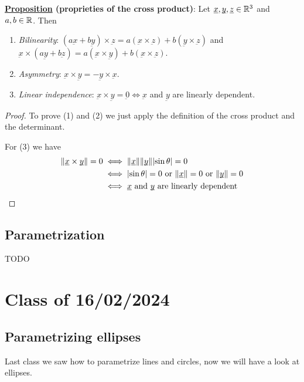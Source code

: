 \documentclass[10pt]{extarticle}
\renewcommand{\vec}[1]{\underbar{\ensuremath{#1}}}
\begin{document}
\textbf{\underline{Proposition} (proprieties of the cross product)}:
Let $\vec{x}, \vec{y}, \vec{z} \in \R^3$ and $a, b \in \mathbb{R}$. Then

\begin{enumerate}
    \item \textit{Bilinearity}: $(a \vec{x} + b \vec{y}) \times \vec{z} = a (\vec{x} \times \vec{z}) + b (\vec{y} \times \vec{z})$ and $\vec{x} \times (a \vec{y} + b \vec{z}) = a (\vec{x} \times \vec{y}) + b (\vec{x} \times \vec{z})$.
    \item \textit{Asymmetry}: $\vec{x} \times \vec{y} = - \vec{y} \times \vec{x}$.
    \item \textit{Linear independence}: $\vec{x} \times \vec{y} = \vec{0} \iff \vec{x}$ and $\vec{y}$ are linearly dependent.
\end{enumerate}

\begin{proof}
    To prove (1) and (2) we just apply the definition of the cross product and the determinant.

    For (3) we have
    \begin{align*}
        \norm{\vec{x} \times \vec{y}} = 0
         & \iff
        \norm {\vec{x}} \norm{\vec{y}} \abs{\sin \theta} = 0                                        \\
         & \iff \abs{\sin \theta} = 0 \text{ or } \norm{\vec{x}} = 0 \text{ or } \norm{\vec{y}} = 0 \\
         & \iff \vec{x} \text{ and } \vec{y} \text{ are linearly dependent}
    \end{align*}

\end{proof}

\subsection{Parametrization}

TODO

\section{Class of 16/02/2024}

\subsection{Parametrizing ellipses}

Last class we saw how to parametrize lines and circles, now we will have a look at ellipses.
\end{document}
